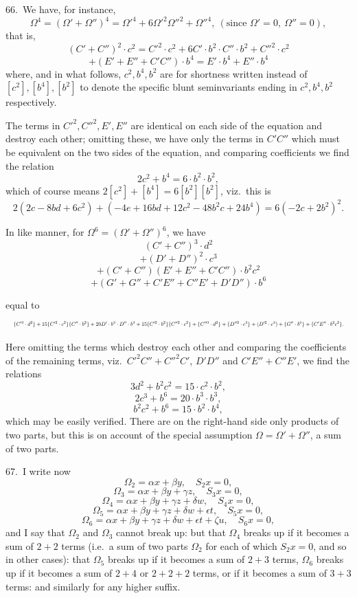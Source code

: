 \documentclass[11pt]{article}
\begin{document}
66.\ We have, for instance,
\[
\Omega^4 = (\Omega' + \Omega'')^4 = \Omega'^4 + 6\Omega'^2\Omega''^2 + \Omega''^4,\ (\text{since } \Omega' = 0,\ \Omega'' = 0),
\]
that is,
\[
(C' + C'')^2 \cdot c^2 = C'^2 \cdot c^2 + 6C' \cdot b^2 \cdot C'' \cdot b^2 + C''^2 \cdot c^2
\]
\[
+ (E' + E'' + C'C'') \cdot b^4 = E' \cdot b^4 + E'' \cdot b^4
\]
where, and in what follows, $c^2, b^4, b^2$ are for shortness written instead of $[c^2], [b^4], [b^2]$ to denote the specific blunt seminvariants ending in $c^2, b^4, b^2$ respectively.

The terms in $C'^2, C''^2, E', E''$ are identical on each side of the equation and destroy each other; omitting these, we have only the terms in $C'C''$ which must be equivalent on the two sides of the equation, and comparing coefficients we find the relation
\[
2c^2 + b^4 = 6 \cdot b^2 \cdot b^2,
\]
which of course means $2 [c^2] + [b^4] = 6 [b^2] [b^2]$, viz.\ this is
\[
2 (2c - 8bd + 6c^2) + (-4e + 16bd + 12c^2 - 48b^2c + 24b^4) = 6 (-2c + 2b^2)^2.
\]

In like manner, for $\Omega^6 = (\Omega' + \Omega'')^6$, we have
\[
(C' + C'')^3 \cdot d^2
\]
\[
+ (D' + D'')^2 \cdot c^3
\]
\[
+ (C' + C'')(E' + E'' + C'C'') \cdot b^2c^2
\]
\[
+ (G' + G'' + C'E'' + C''E' + D'D'') \cdot b^6
\]

\clearpage
equal to
\[
\resizebox{\textwidth}{!}{$\displaystyle
\{C'^3 \cdot d^2\} + 15 \{C'^2 \cdot c^2\} \{C'' \cdot b^2\} + 20 D' \cdot b^3 \cdot D'' \cdot b^3 + 15 \{C'^2 \cdot b^2\} \{C''^2 \cdot c^2\} + \{C''^3 \cdot d^2\}
+ \{D''^2 \cdot c^3\} + (D'^2 \cdot c^3)
+ \{G'' \cdot b^6\} + \{C'E'' \cdot b^2c^2\}.
$}
\]

Here omitting the terms which destroy each other and comparing the coefficients of the remaining terms, viz.\ $C'^2C'' + C''^2C'$, $D'D''$ and $C'E'' + C''E'$, we find the relations
\[
3d^2 + b^2c^2 = 15 \cdot c^2 \cdot b^2,
\]
\[
2c^3 + b^6 = 20 \cdot b^3 \cdot b^3,
\]
\[
b^2c^2 + b^6 = 15 \cdot b^2 \cdot b^4,
\]
which may be easily verified. There are on the right-hand side only products of two parts, but this is on account of the special assumption $\Omega = \Omega' + \Omega''$, a sum of two parts.

67.\ I write now
\[
\Omega_2 = \alpha x + \beta y,\quad S_2 x = 0,
\]
\[
\Omega_3 = \alpha x + \beta y + \gamma z,\quad S_3 x = 0,
\]
\[
\Omega_4 = \alpha x + \beta y + \gamma z + \delta w,\quad S_4 x = 0,
\]
\[
\Omega_5 = \alpha x + \beta y + \gamma z + \delta w + \epsilon t,\quad S_5 x = 0,
\]
\[
\Omega_6 = \alpha x + \beta y + \gamma z + \delta w + \epsilon t + \zeta u,\quad S_6 x = 0,
\]
and I say that $\Omega_2$ and $\Omega_3$ cannot break up: but that $\Omega_4$ breaks up if it becomes a sum of $2 + 2$ terms (i.e.\ a sum of two parts $\Omega_2$ for each of which $S_2 x = 0$, and so in other cases): that $\Omega_5$ breaks up if it becomes a sum of $2 + 3$ terms, $\Omega_6$ breaks up if it becomes a sum of $2 + 4$ or $2 + 2 + 2$ terms, or if it becomes a sum of $3 + 3$ terms: and similarly for any higher suffix.
\end{document}
